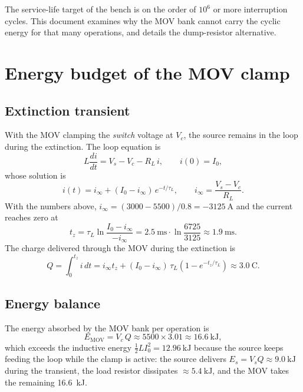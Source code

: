\documentclass[11pt,a4paper]{article}
\begin{document}
The service-life target of the bench is on the order of $10^6$ or more
interruption cycles. This document examines why the MOV bank cannot carry the
cyclic energy for that many operations, and details the dump-resistor
alternative.

\section{Energy budget of the MOV clamp}
\label{sec:mov}

\subsection{Extinction transient}

With the MOV clamping the \emph{switch} voltage at $V_c$, the source remains
in the loop during the extinction. The loop equation is
\begin{equation}
L\frac{di}{dt} = V_s - V_c - R_L\, i , \qquad i(0)=I_0 ,
\end{equation}
whose solution is
\begin{equation}
i(t) = i_\infty + (I_0 - i_\infty)\, e^{-t/\tau_L},
\qquad i_\infty = \frac{V_s - V_c}{R_L} .
\label{eq:movdecay}
\end{equation}
With the numbers above, $i_\infty = (3000-5500)/0.8 = \SI{-3125}{\ampere}$ and
the current reaches zero at
\begin{equation}
t_z = \tau_L \ln\!\frac{I_0 - i_\infty}{-i_\infty}
    = \SI{2.5}{\milli\second}\cdot\ln\!\frac{6725}{3125}
    \approx \SI{1.9}{\milli\second}.
\end{equation}
The charge delivered through the MOV during the extinction is
\begin{equation}
Q = \int_0^{t_z} i\,dt
  = i_\infty t_z + (I_0-i_\infty)\,\tau_L\!\left(1-e^{-t_z/\tau_L}\right)
  \approx \SI{3.0}{\coulomb}.
\end{equation}

\subsection{Energy balance}

The energy absorbed by the MOV bank per operation is
\begin{equation}
E_{\mathrm{MOV}} = V_c\, Q \approx 5500 \times 3.01 \approx
\SI{16.6}{\kilo\joule},
\end{equation}
which exceeds the inductive energy $\tfrac{1}{2}LI_0^2 =
\SI{12.96}{\kilo\joule}$ because the source keeps feeding the loop while the
clamp is active: the source delivers $E_s = V_s Q \approx
\SI{9.0}{\kilo\joule}$ during the transient, the load resistor dissipates
$\approx \SI{5.4}{\kilo\joule}$, and the MOV takes the remaining
\SI{16.6}{\kilo\joule}.
\end{document}
